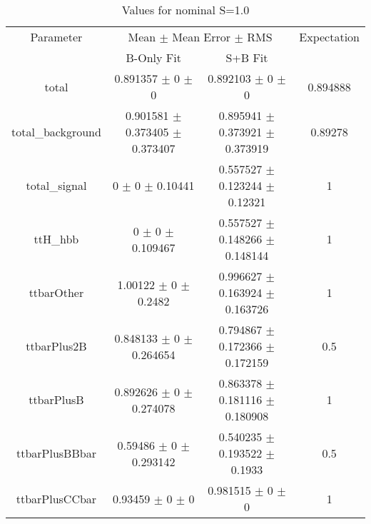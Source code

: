 \begin{table}
\centering
\caption{Values for nominal S=1.0}
\begin{tabular}{cccc}
\toprule
Parameter & \multicolumn{2}{c}{Mean $\pm$ Mean Error $\pm$ RMS} & Expectation\\
 & B-Only Fit & S+B Fit & \\
\midrule
total & \num{0.891357} $\pm$ \num{0} $\pm$ \num{0} & \num{0.892103} $\pm$ \num{0} $\pm$ \num{0} & \num{0.894888}\\
total\_background & \num{0.901581} $\pm$ \num{0.373405} $\pm$ \num{0.373407} & \num{0.895941} $\pm$ \num{0.373921} $\pm$ \num{0.373919} & \num{0.89278}\\
total\_signal & \num{0} $\pm$ \num{0} $\pm$ \num{0.10441} & \num{0.557527} $\pm$ \num{0.123244} $\pm$ \num{0.12321} & \num{1}\\
ttH\_hbb & \num{0} $\pm$ \num{0} $\pm$ \num{0.109467} & \num{0.557527} $\pm$ \num{0.148266} $\pm$ \num{0.148144} & \num{1}\\
ttbarOther & \num{1.00122} $\pm$ \num{0} $\pm$ \num{0.2482} & \num{0.996627} $\pm$ \num{0.163924} $\pm$ \num{0.163726} & \num{1}\\
ttbarPlus2B & \num{0.848133} $\pm$ \num{0} $\pm$ \num{0.264654} & \num{0.794867} $\pm$ \num{0.172366} $\pm$ \num{0.172159} & \num{0.5}\\
ttbarPlusB & \num{0.892626} $\pm$ \num{0} $\pm$ \num{0.274078} & \num{0.863378} $\pm$ \num{0.181116} $\pm$ \num{0.180908} & \num{1}\\
ttbarPlusBBbar & \num{0.59486} $\pm$ \num{0} $\pm$ \num{0.293142} & \num{0.540235} $\pm$ \num{0.193522} $\pm$ \num{0.1933} & \num{0.5}\\
ttbarPlusCCbar & \num{0.93459} $\pm$ \num{0} $\pm$ \num{0} & \num{0.981515} $\pm$ \num{0} $\pm$ \num{0} & \num{1}\\
\bottomrule
\end{tabular}
\end{table}